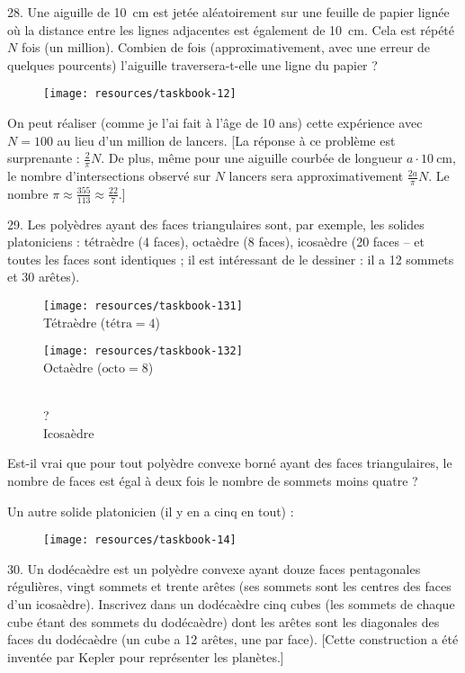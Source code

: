 \begin{problem}{28.}
	Une aiguille de \SI{10}{\cm} est jetée aléatoirement sur une feuille de
	papier lignée où la distance entre les lignes adjacentes est également de
	\SI{10}{\cm}. Cela est répété $N$ fois (un million).
	Combien de fois (approximativement, avec une erreur de quelques pourcents)
	l'aiguille traversera-t-elle une ligne du papier ?
	\begin{figure}
		\texttt{[image: resources/taskbook-12]}
	\end{figure}
	On peut réaliser (comme je l'ai fait à l'âge de 10 ans) cette expérience
	avec $N=100$ au lieu d'un million de lancers.
	[La réponse à ce problème est surprenante : $\frac2{\pi}N$. De plus, même
	pour une aiguille courbée de longueur $a \cdot \SI{10}{\cm}$, le nombre
	d'intersections observé sur $N$ lancers sera approximativement
	$\frac{2a}{\pi}N$.
	Le nombre $\pi \approx  \frac{355}{113} \approx \frac{22}7.$]
\end{problem}

\begin{problem}{29.}
	Les polyèdres ayant des faces triangulaires sont, par exemple, les solides
	platoniciens : tétraèdre (4 faces), octaèdre (8 faces), icosaèdre (20 faces
	– et toutes les faces sont identiques ; il est intéressant de le dessiner :
	il a 12 sommets et 30 arêtes).
	\begin{figure}
		\footnotesize
		\null\hfill
		\parbox{0.3\linewidth}{\centering\texttt{[image: resources/taskbook-131]}\\Tétraèdre
		($\text{tétra}= 4$)}
		\hfill
		\parbox{0.3\linewidth}{\centering\texttt{[image: resources/taskbook-132]}\\Octaèdre
		($\text{octo}= 8$)} \hfill\null\\
		{\Huge ?}\\Icosaèdre
	\end{figure}
	Est-il vrai que pour tout polyèdre convexe borné ayant des faces
	triangulaires, le nombre de faces est égal à deux fois le nombre de sommets
	moins quatre ?

	Un autre solide platonicien (il y en a cinq en tout) :
	\begin{figure}
		\texttt{[image: resources/taskbook-14]}
	\end{figure}
\end{problem}

\begin{problem}{30.}
	Un dodécaèdre est un polyèdre convexe ayant douze faces pentagonales
	régulières, vingt sommets et trente arêtes (ses sommets sont les centres des
	faces d'un icosaèdre).
	Inscrivez dans un dodécaèdre cinq cubes (les sommets de chaque cube étant
	des sommets du dodécaèdre) dont les arêtes sont les diagonales des faces du
	dodécaèdre (un cube a 12 arêtes, une par face).
	[Cette construction a été inventée par Kepler pour représenter les
	planètes.]
\end{problem}


